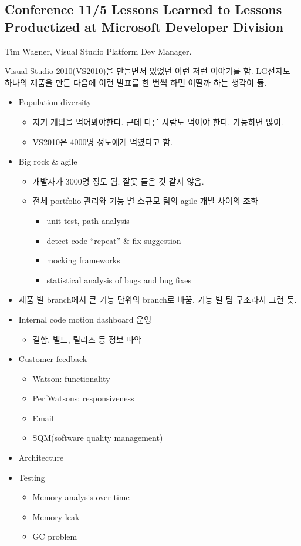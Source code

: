 \documentclass[a4paper]{article}
\begin{document}
\subsection{Conference 11/5 Lessons Learned to Lessons Productized at
  Microsoft Developer Division}
 
Tim Wagner, Visual Studio Platform Dev Manager.
 
Visual Studio 2010(VS2010)을 만들면서 있었던 이런 저런 이야기를
함. LG전자도 하나의 제품을 만든 다음에 이런 발표를 한 번씩 하면 어떨까
하는 생각이 듦.
 
\begin{itemize}
\item Population diversity
    \begin{itemize}
    \item 자기 개밥을 먹어봐야한다. 근데 다른 사람도 먹여야 한다. 가능하면 많이.
    \item VS2010은 4000명 정도에게 먹였다고 함.
    \end{itemize}
\item Big rock \& agile
    \begin{itemize}
    \item 개발자가 3000명 정도 됨. 잘못 들은 것 같지 않음.
    \item 전체 portfolio 관리와 기능 별 소규모 팀의 agile 개발 사이의 조화
        \begin{itemize}
        \item unit test, path analysis
        \item detect code ``repeat'' \& fix suggestion
        \item mocking frameworks
        \item statistical analysis of bugs and bug fixes
        \end{itemize}
    \end{itemize}
\item 제품 별 branch에서 큰 기능 단위의 branch로 바꿈.  기능 별 팀 구조라서 그런 듯.
\item Internal code motion dashboard 운영
    \begin{itemize}
    \item 결함, 빌드, 릴리즈 등 정보 파악
    \end{itemize}
\item Customer feedback
    \begin{itemize}
    \item Watson: functionality
    \item PerfWatsons: responsiveness
    \item Email
    \item SQM(software quality management)
    \end{itemize}
\item Architecture
\item Testing
    \begin{itemize}
    \item Memory analysis over time
    \item Memory leak
    \item GC problem
    \end{itemize}
\end{itemize}
 
\end{document}
